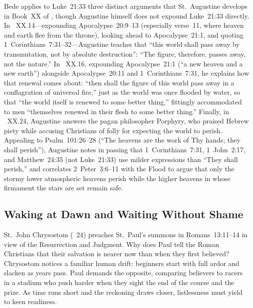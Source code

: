 Bede applies to Luke~21:33 three distinct arguments that St.~Augustine develops in Book~XX of , though Augustine himself does not expound Luke~21:33 directly. In ~XX.14---expounding Apocalypse~20:9--13 (especially verse~11, where heaven and earth flee from the throne), looking ahead to Apocalypse~21:1, and quoting 1~Corinthians~7:31--32---Augustine teaches that ``this world shall pass away by transmutation, not by absolute destruction'': ``The figure, therefore, passes away, not the nature.'' In ~XX.16, expounding Apocalypse~21:1 (``a new heaven and a new earth'') alongside Apocalypse~20:11 and 1~Corinthians~7:31, he explains how that renewal comes about: ``then shall the figure of this world pass away in a conflagration of universal fire,'' just as the world was once flooded by water, so that ``the world itself is renewed to some better thing,'' fittingly accommodated to men ``themselves renewed in their flesh to some better thing.'' Finally, in ~XX.24, Augustine answers the pagan philosopher Porphyry, who praised Hebrew piety while accusing Christians of folly for expecting the world to perish. Appealing to Psalm~101:26--28 (``The heavens are the work of Thy hands; they shall perish''), Augustine notes in passing that 1~Corinthians~7:31, 1~John~2:17, and Matthew~24:35 (not Luke~21:33) use milder expressions than ``They shall perish,'' and correlates 2~Peter~3:6--11 with the Flood to argue that only the stormy lower atmospheric heavens perish while the higher heavens in whose firmament the stars are set remain safe.

\subsection{Waking at Dawn and Waiting Without Shame}

St.~John Chrysostom (~24) preaches St.~Paul's summons in Romans~13:11--14 in view of the Resurrection and Judgment. Why does Paul tell the Roman Christians that their salvation is nearer now than when they first believed? Chrysostom notices a familiar human drift: beginners start with full ardor and slacken as years pass. Paul demands the opposite, comparing believers to racers in a stadium who push harder when they sight the end of the course and the prize. As time runs short and the reckoning draws closer, listlessness must yield to keen readiness.

